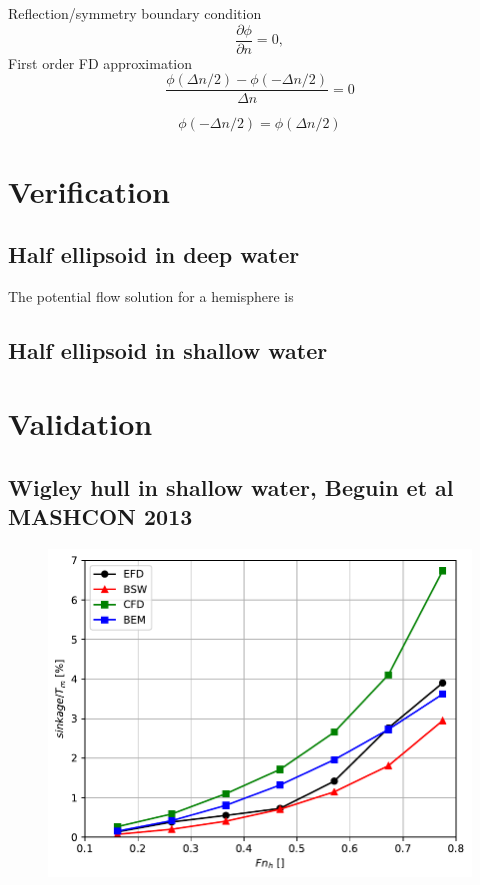\documentclass[]{book}
\newcommand{\D}[2]{\frac{\partial #1}{\partial #2}}
\begin{document}
Reflection/symmetry boundary condition
\begin{equation}
\D{\phi}{n} = 0,
\end{equation}
First order FD approximation
\begin{equation}
\frac{\phi(\Delta n /2) - \phi(-\Delta n /2)}{\Delta n} = 0
\end{equation}

\begin{equation}
\phi(-\Delta n /2) = \phi(\Delta n /2) 
\end{equation}


	


\chapter{Verification}
\section{Half ellipsoid in deep water}
The potential flow solution for a hemisphere is \cite{newman2018}
\section{Half ellipsoid in shallow water}
\chapter{Validation}
\section{Wigley hull in shallow water, Beguin et al MASHCON 2013}
\begin{figure}
	\centering
	\includegraphics[width=0.9\linewidth]{figures/Example03_Beguin_MASHCON2013_WigleyHull}
	\caption{}
	\label{fig:example03beguinmashcon2013wigleyhull}
\end{figure}
\end{document}
